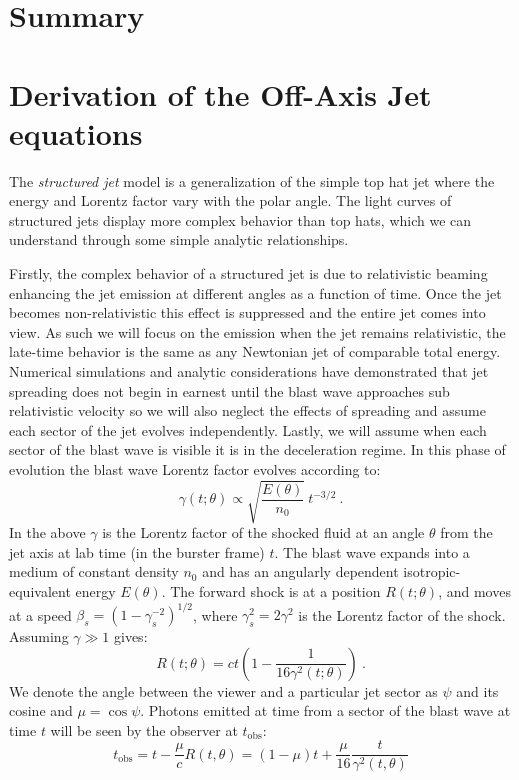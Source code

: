 \documentclass[twocolumn]{aastex62}
\newcommand{\tobs}{\ensuremath{t_{\mathrm{obs}}}}
\begin{document}
\section{Summary}


\newpage


\appendix
\section{Derivation of the Off-Axis Jet equations}\label{sec:derive1}

  The \emph{structured jet} model is a generalization of the simple top hat jet where the energy and Lorentz factor vary with the polar angle.  The light curves of structured jets display more complex behavior than top hats, which we can understand through some simple analytic relationships.
  
  Firstly, the complex behavior of a structured jet is due to relativistic beaming enhancing the jet emission at different angles as a function of time.  Once the jet becomes non-relativistic this effect is suppressed and the entire jet comes into view.  As such we will focus on the emission when the jet remains relativistic, the late-time behavior is the same as any Newtonian jet of comparable total energy.  Numerical simulations and analytic considerations have demonstrated that jet spreading does not begin in earnest until the blast wave approaches sub relativistic velocity so we will also neglect the effects of spreading and assume each sector of the jet evolves independently.  Lastly, we will assume when each sector of the blast wave is visible it is in the deceleration regime.  In this phase of evolution the blast wave Lorentz factor evolves according to:
  \begin{equation}
	\gamma(t; \theta) \propto \sqrt{\frac{E(\theta)}{n_0}}\ t^{-3/2}\ . \label{eq:lorentzEvolution}
\end{equation}
  In the above $\gamma$ is the Lorentz factor of the shocked fluid at an angle $\theta$ from the jet axis at lab time (in the burster frame) $t$.  The blast wave expands into a medium of constant density $n_0$ and has an angularly dependent isotropic-equivalent energy $E(\theta)$.  The forward shock is at a position $R(t; \theta)$, and moves at a speed $\beta_s = (1-\gamma_s^{-2})^{1/2}$, where $\gamma_s^2 = 2 \gamma^2$ is the Lorentz factor of the shock.  Assuming $\gamma \gg 1$ gives:
\begin{equation}
	R(t; \theta) = ct\left(1-\frac{1}{16 \gamma^2(t; \theta)}\right)\ .
\end{equation}
We denote the angle between the viewer and a particular jet sector as $\psi$ and its cosine and $\mu = \cos \psi$.  Photons emitted at time from a sector of the blast wave at time $t$ will be seen by the observer at $\tobs$:
\begin{equation}
	\tobs = t - \frac{\mu}{c} R(t,\theta) = (1-\mu)t + \frac{\mu}{16}\frac{t}{ \gamma^2(t,\theta)} \label{eq:tobs}
\end{equation}
\end{document}
